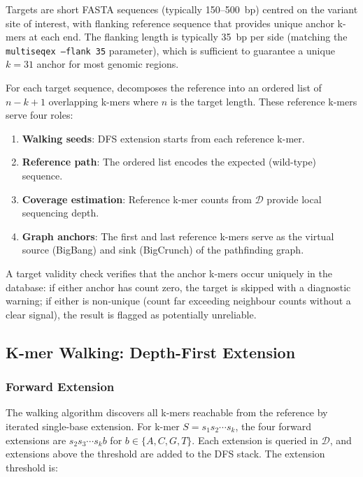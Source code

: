 Targets are short FASTA sequences (typically 150--500~bp) centred on the variant
site of interest, with flanking reference sequence that provides unique anchor
k-mers at each end.  The flanking length is typically 35~bp per side (matching
the \kam{} \texttt{multiseqex --flank 35} parameter), which is sufficient to
guarantee a unique $k=31$ anchor for most genomic regions.

For each target sequence, \kmerdet{} decomposes the reference into an ordered
list of $n - k + 1$ overlapping k-mers where $n$ is the target length.  These
reference k-mers serve four roles:
\begin{enumerate}
  \item \textbf{Walking seeds}: DFS extension starts from each reference k-mer.
  \item \textbf{Reference path}: The ordered list encodes the expected (wild-type) sequence.
  \item \textbf{Coverage estimation}: Reference k-mer counts from $\mathcal{D}$ provide local sequencing depth.
  \item \textbf{Graph anchors}: The first and last reference k-mers serve as the virtual source (BigBang) and sink (BigCrunch) of the pathfinding graph.
\end{enumerate}

A target validity check verifies that the anchor k-mers occur uniquely in the
database: if either anchor has count zero, the target is skipped with a
diagnostic warning; if either is non-unique (count far exceeding neighbour
counts without a clear signal), the result is flagged as potentially unreliable.

\subsection{K-mer Walking: Depth-First Extension}
\label{sec:walking}

\subsubsection{Forward Extension}

The walking algorithm discovers all k-mers reachable from the reference by
iterated single-base extension.  For k-mer $S = s_1 s_2 \cdots s_k$, the four
forward extensions are $s_2 s_3 \cdots s_k b$ for $b \in \{A, C, G, T\}$.
Each extension is queried in $\mathcal{D}$, and extensions above the threshold
are added to the DFS stack.  The extension threshold is:


